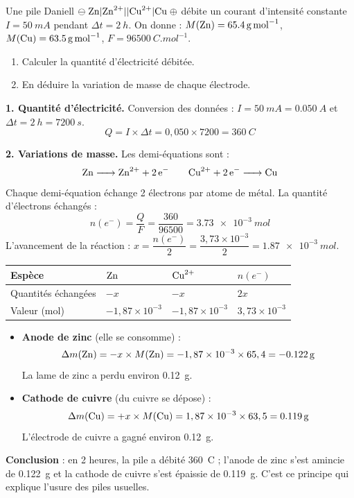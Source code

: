 \documentclass[11pt]{article}
\begin{document}
\begin{exoresolu}
Une pile Daniell $\ominus \; \ce{Zn} | \ce{Zn^2+} || \ce{Cu^2+} | \ce{Cu} \; \oplus$ débite un courant d'intensité constante $I = \SI{50}{mA}$ pendant $\Delta t = \SI{2}{h}$. On donne : $M(\ce{Zn}) = \SI{65,4}{g.mol^{-1}}$, $M(\ce{Cu}) = \SI{63,5}{g.mol^{-1}}$, $F = \SI{96500}{C.mol^{-1}}$.
\begin{enumerate}
\item Calculer la quantité d'électricité débitée.
\item En déduire la variation de masse de chaque électrode.
\end{enumerate}
\tcblower
\textbf{1. Quantité d'électricité.} Conversion des données : $I = \SI{50}{mA} = \SI{0,050}{A}$ et $\Delta t = \SI{2}{h} = \SI{7200}{s}$.
\[ Q = I \times \Delta t = 0,050 \times 7200 = \SI{360}{C} \]

\textbf{2. Variations de masse.} Les demi-équations sont :
\[ \ce{Zn -> Zn^2+ + 2e-} \qquad \ce{Cu^2+ + 2e- -> Cu} \]
Chaque demi-équation échange 2 électrons par atome de métal. La quantité d'électrons échangés :
\[ n(e^-) = \frac{Q}{F} = \frac{360}{96500} = \SI{3,73e-3}{mol} \]
L'avancement de la réaction : $x = \dfrac{n(e^-)}{2} = \dfrac{3,73 \times 10^{-3}}{2} = \SI{1,87e-3}{mol}$.

\begin{center}
\begin{tabularx}{\linewidth}{|l|X|X|X|}
\hline
\rowcolor{popblueL} Espèce & $\ce{Zn}$ & $\ce{Cu^2+}$ & $n(e^-)$ \\
\hline
Quantités échangées & $-x$ & $-x$ & $2x$ \\
\hline
Valeur (mol) & $-1,87\times 10^{-3}$ & $-1,87\times 10^{-3}$ & $3,73\times 10^{-3}$ \\
\hline
\end{tabularx}
\end{center}

\begin{itemize}
\item \textbf{Anode de zinc} (elle se consomme) :
\[ \Delta m(\ce{Zn}) = -x \times M(\ce{Zn}) = -1,87 \times 10^{-3} \times 65,4 = \SI{-0,122}{g} \]
La lame de zinc a perdu environ \SI{0,12}{g}.
\item \textbf{Cathode de cuivre} (du cuivre se dépose) :
\[ \Delta m(\ce{Cu}) = +x \times M(\ce{Cu}) = 1,87 \times 10^{-3} \times 63,5 = \SI{+0,119}{g} \]
L'électrode de cuivre a gagné environ \SI{0,12}{g}.
\end{itemize}

\textbf{Conclusion} : en 2 heures, la pile a débité \SI{360}{C} ; l'anode de zinc s'est amincie de \SI{0,122}{g} et la cathode de cuivre s'est épaissie de \SI{0,119}{g}. C'est ce principe qui explique l'usure des piles usuelles.
\end{exoresolu}
\end{document}
